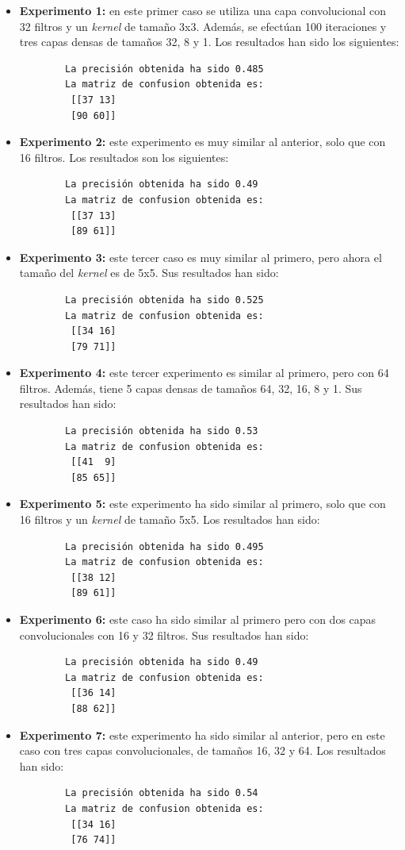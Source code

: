 \begin{itemize}
    \item \textbf{Experimento 1:} en este primer caso se utiliza una capa convolucional con 32 filtros y un \emph{kernel} de tamaño 3x3. Además, se efectúan 100 iteraciones y tres capas densas de tamaños 32, 8 y 1. Los resultados han sido los siguientes:
    \begin{verbatim}
        La precisión obtenida ha sido 0.485
        La matriz de confusion obtenida es:
         [[37 13]
         [90 60]]
    \end{verbatim}
    \item \textbf{Experimento 2:} este experimento es muy similar al anterior, solo que con 16 filtros. Los resultados son los siguientes:
    \begin{verbatim}
        La precisión obtenida ha sido 0.49
        La matriz de confusion obtenida es:
         [[37 13]
         [89 61]]
    \end{verbatim}
    \item \textbf{Experimento 3:} este tercer caso es muy similar al primero, pero ahora el tamaño del \emph{kernel} es de 5x5. Sus resultados han sido:
    \begin{verbatim}
        La precisión obtenida ha sido 0.525
        La matriz de confusion obtenida es:
         [[34 16]
         [79 71]]
    \end{verbatim}
    \item \textbf{Experimento 4:} este tercer experimento es similar al primero, pero con 64 filtros. Además, tiene 5 capas densas de tamaños 64, 32, 16, 8 y 1. Sus resultados han sido:
    \begin{verbatim}
        La precisión obtenida ha sido 0.53
        La matriz de confusion obtenida es:
         [[41  9]
         [85 65]]
    \end{verbatim}
    \item \textbf{Experimento 5:} este experimento ha sido similar al primero, solo que con 16 filtros y un \emph{kernel} de tamaño 5x5. Los resultados han sido:
    \begin{verbatim}
        La precisión obtenida ha sido 0.495
        La matriz de confusion obtenida es:
         [[38 12]
         [89 61]]
    \end{verbatim}
    \item \textbf{Experimento 6:} este caso ha sido similar al primero pero con dos capas convolucionales con 16 y 32 filtros. Sus resultados han sido:
    \begin{verbatim}
        La precisión obtenida ha sido 0.49
        La matriz de confusion obtenida es:
         [[36 14]
         [88 62]]
    \end{verbatim}
    \item \textbf{Experimento 7:} este experimento ha sido similar al anterior, pero en este caso con tres capas convolucionales, de tamaños 16, 32 y 64. Los resultados han sido:
    \begin{verbatim}
        La precisión obtenida ha sido 0.54
        La matriz de confusion obtenida es:
         [[34 16]
         [76 74]]
    \end{verbatim}
\end{itemize}

